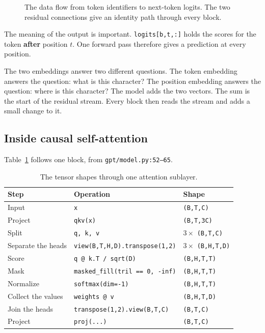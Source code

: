 \documentclass[11pt,a4paper]{article}
\newcommand{\code}[1]{\texttt{#1}}
\begin{document}
\begin{figure}[htbp]
\caption{The data flow from token identifiers to next-token logits. The two residual
connections give an identity path through every block.}
\label{fig:arch}
\end{figure}

The meaning of the output is important. \code{logits[b,t,:]} holds the scores for the token
\textbf{after} position $t$. One forward pass therefore gives a prediction at every position.

The two embeddings answer two different questions. The token embedding answers the question: what
is this character? The position embedding answers the question: where is this character? The model
adds the two vectors. The sum is the start of the residual stream. Every block then reads the
stream and adds a small change to it.

\subsection{Inside causal self-attention}

Table~\ref{tab:shapes} follows one block, from \code{gpt/model.py:52--65}.

\begin{table}[htbp]\centering
\begin{tabular}{@{}lll@{}}
\toprule
\textbf{Step} & \textbf{Operation} & \textbf{Shape} \\
\midrule
Input & \code{x} & \code{(B,T,C)} \\
Project & \code{qkv(x)} & \code{(B,T,3C)} \\
Split & \code{q, k, v} & $3 \times$ \code{(B,T,C)} \\
Separate the heads & \code{view(B,T,H,D).transpose(1,2)} & $3 \times$ \code{(B,H,T,D)} \\
Score & \code{q @ k.T / sqrt(D)} & \code{(B,H,T,T)} \\
Mask & \code{masked\_fill(tril == 0, -inf)} & \code{(B,H,T,T)} \\
Normalize & \code{softmax(dim=-1)} & \code{(B,H,T,T)} \\
Collect the values & \code{weights @ v} & \code{(B,H,T,D)} \\
Join the heads & \code{transpose(1,2).view(B,T,C)} & \code{(B,T,C)} \\
Project & \code{proj(...)} & \code{(B,T,C)} \\
\bottomrule
\end{tabular}
\caption{The tensor shapes through one attention sublayer.}
\label{tab:shapes}
\end{table}
\end{document}
